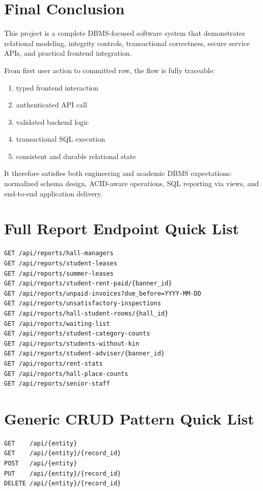 \documentclass[11pt,a4paper]{article}
\begin{document}
\section{Final Conclusion}
This project is a complete DBMS-focused software system that demonstrates relational modeling, integrity controls, transactional correctness, secure service APIs, and practical frontend integration.

From first user action to committed row, the flow is fully traceable:
\begin{enumerate}
  \item typed frontend interaction
  \item authenticated API call
  \item validated backend logic
  \item transactional SQL execution
  \item consistent and durable relational state
\end{enumerate}

It therefore satisfies both engineering and academic DBMS expectations: normalized schema design, ACID-aware operations, SQL reporting via views, and end-to-end application delivery.

\appendix
\section{Full Report Endpoint Quick List}
\begin{lstlisting}[language={}]
GET /api/reports/hall-managers
GET /api/reports/student-leases
GET /api/reports/summer-leases
GET /api/reports/student-rent-paid/{banner_id}
GET /api/reports/unpaid-invoices?due_before=YYYY-MM-DD
GET /api/reports/unsatisfactory-inspections
GET /api/reports/hall-student-rooms/{hall_id}
GET /api/reports/waiting-list
GET /api/reports/student-category-counts
GET /api/reports/students-without-kin
GET /api/reports/student-adviser/{banner_id}
GET /api/reports/rent-stats
GET /api/reports/hall-place-counts
GET /api/reports/senior-staff
\end{lstlisting}

\section{Generic CRUD Pattern Quick List}
\begin{lstlisting}[language={}]
GET    /api/{entity}
GET    /api/{entity}/{record_id}
POST   /api/{entity}
PUT    /api/{entity}/{record_id}
DELETE /api/{entity}/{record_id}
\end{lstlisting}
\end{document}

